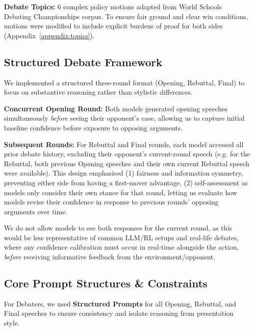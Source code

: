 \documentclass{article}
\begin{document}
\textbf{Debate Topics:} 6 complex policy motions adapted from World Schools Debating Championships corpus. To ensure fair ground and clear win conditions, motions were modified to include explicit burdens of proof for both sides (Appendix~\ref{appendix:topics}).

\subsection{Structured Debate Framework}
\label{subsec:debate_framework}

We implemented a structured three-round format (Opening, Rebuttal, Final) to focus on substantive reasoning rather than stylistic differences.

\textbf{Concurrent Opening Round:} Both models generated opening speeches simultaneously \textit{before} seeing their opponent's case, allowing us to capture initial baseline confidence before exposure to opposing arguments.

\textbf{Subsequent Rounds:} For Rebuttal and Final rounds, each model accessed all prior debate history, excluding their opponent's current-round speech (e.g. for the Rebuttal, both previous Opening speeches and their own current Rebuttal speech were available). This design emphasised (1) fairness and information symmetry, preventing either side from having a first-mover advantage, (2) self-assessment as models only consider their own stance for that round, letting us evaluate how models revise their confidence in response to previous rounds' opposing arguments over time.

We do not allow models to see both responses for the current round, as this would be less representative of common LLM/RL setups and real-life debates, where any confidence calibration must occur in real-time alongside the action, \textit{before} receiving informative feedback from the environment/opponent.

\subsection{Core Prompt Structures \& Constraints}
\label{subsec:prompts}
For Debaters, we used \textbf{Structured Prompts} for all Opening, Rebuttal, and Final speeches to ensure consistency and isolate reasoning from presentation style.
\end{document}
